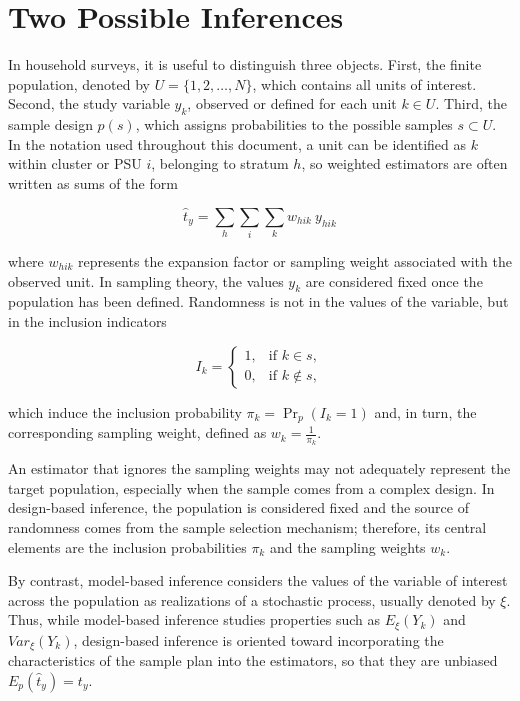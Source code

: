 \documentclass[
  english,
  12pt,
]{book}
\begin{document}
\section{Two Possible Inferences}\label{dos-posibles-inferencias}

In household surveys, it is useful to distinguish three objects. First, the finite population, denoted by \(U = \{1,2,\ldots,N\}\), which contains all units of interest. Second, the study variable \(y_k\), observed or defined for each unit \(k \in U\). Third, the sample design \(p(s)\), which assigns probabilities to the possible samples \(s \subset U\). In the notation used throughout this document, a unit can be identified as \(k\) within cluster or PSU \(i\), belonging to stratum \(h\), so weighted estimators are often written as sums of the form

\[
\hat{t}_y = \sum_h \sum_i \sum_k w_{hik} \ y_{hik}
\]

where \(w_{hik}\) represents the expansion factor or sampling weight associated with the observed unit. In sampling theory, the values \(y_k\) are considered fixed once the population has been defined. Randomness is not in the values of the variable, but in the inclusion indicators

\[
I_k =
\begin{cases}
1, & \text{if } k \in s,\\
0, & \text{if } k \notin s,
\end{cases}
\]

which induce the inclusion probability \(\pi_k = \Pr_p(I_k=1)\) and, in turn, the corresponding sampling weight, defined as \(w_k = \frac{1}{\pi_k}\).

An estimator that ignores the sampling weights may not adequately represent the target population, especially when the sample comes from a complex design. In design-based inference, the population is considered fixed and the source of randomness comes from the sample selection mechanism; therefore, its central elements are the inclusion probabilities \(\pi_k\) and the sampling weights \(w_k\).

By contrast, model-based inference considers the values of the variable of interest across the population as realizations of a stochastic process, usually denoted by \(\xi\). Thus, while model-based inference studies properties such as \(E_{\xi}(Y_k)\) and \(Var_{\xi}(Y_k)\), design-based inference is oriented toward incorporating the characteristics of the sample plan into the estimators, so that they are unbiased \(E_{p}(\hat{t}_y) = t_y\).
\end{document}

